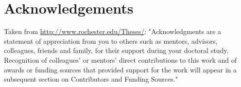 \documentclass[\main/master.tex]{subfiles}
\begin{document}
\chapter*{Acknowledgements}
Taken from \url{http://www.rochester.edu/Theses/}: "Acknowledgments are a statement of appreciation from you to others such as mentors, advisors, colleagues, friends and family, for their support during your doctoral study. Recognition of colleagues’ or mentors’ direct contributions to this work and of awards or funding sources that provided support for the work will appear in a subsequent section on Contributors and Funding Sources."
\end{document}
